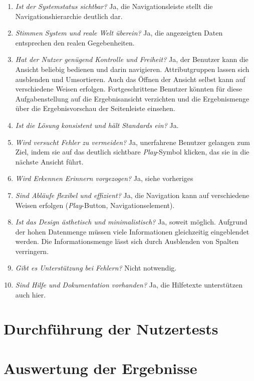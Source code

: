 \begin{enumerate}
 \item \textit{Ist der Systemstatus sichtbar?} Ja, die Navigationsleiste stellt die Navigationshierarchie deutlich dar.
 \item \textit{Stimmen System und reale Welt überein?} Ja, die angezeigten Daten entsprechen den realen Gegebenheiten.
 \item \textit{Hat der Nutzer genügend Kontrolle und Freiheit?} Ja, der Benutzer kann die Ansicht beliebig bedienen und darin navigieren. Attributgruppen lassen sich ausblenden und Umsortieren. Auch das Öffnen der Ansicht selbst kann auf verschiedene Weisen erfolgen. Fortgeschrittene Benutzer könnten für diese Aufgabenstellung auf die Ergebnisansicht verzichten und die Ergebnismenge über die Ergebnisvorschau der Seitenleiste einsehen.
 \item \textit{Ist die Lösung konsistent und hält Standards ein?} Ja.
 \item \textit{Wird versucht Fehler zu vermeiden?} Ja, unerfahrene Benutzer gelangen zum Ziel, indem sie auf das deutlich sichtbare \textit{Play}-Symbol klicken, das sie in die nächste Ansicht führt.
 \item \textit{Wird Erkennen Erinnern vorgezogen?} Ja, siehe vorheriges
 \item \textit{Sind Abläufe flexibel und effizient?} Ja, die Navigation kann auf verschiedene Weisen erfolgen (\textit{Play}-Button, Navigationselement).
 \item \textit{Ist das Design ästhetisch und minimalistisch?} Ja, soweit möglich. Aufgrund der hohen Datenmenge müssen viele Informationen gleichzeitig eingeblendet werden. Die Informationsmenge lässt sich durch Ausblenden von Spalten verringern.
 \item \textit{Gibt es Unterstützung bei Fehlern?} Nicht notwendig.
 \item \textit{Sind Hilfe und Dokumentation vorhanden?} Ja, die Hilfetexte unterstützen auch hier.
\end{enumerate}

\section{Durchführung der Nutzertests} \label{sec:testExecution}

\section{Auswertung der Ergebnisse} \label{sec:analysisConclusion}

